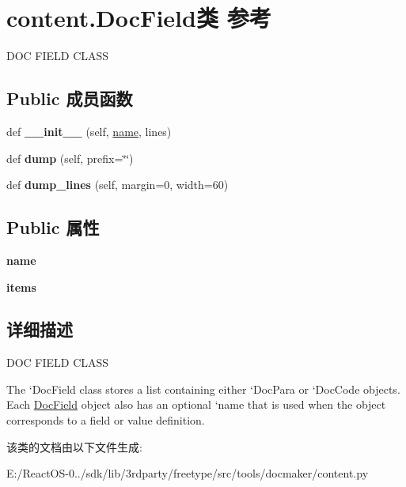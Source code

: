 \hypertarget{classcontent_1_1_doc_field}{}\section{content.\+Doc\+Field类 参考}
\label{classcontent_1_1_doc_field}


D\+OC F\+I\+E\+LD C\+L\+A\+SS  


\subsection*{Public 成员函数}
\begin{DoxyCompactItemize}
\item 
\mbox{\label{classcontent_1_1_doc_field_aee545fdf90bdc952d7693a66f2afc5e6}} 
def {\bfseries \+\_\+\+\_\+init\+\_\+\+\_\+} (self, \hyperlink{structname}{name}, lines)
\item 
\mbox{\label{classcontent_1_1_doc_field_a1646f508e018c91739e87ac3a7abfdff}} 
def {\bfseries dump} (self, prefix=\char`\"{}\char`\"{})
\item 
\mbox{\label{classcontent_1_1_doc_field_aa79ed7b61c0c3caed05fcabd33d8c134}} 
def {\bfseries dump\+\_\+lines} (self, margin=0, width=60)
\end{DoxyCompactItemize}
\subsection*{Public 属性}
\begin{DoxyCompactItemize}
\item 
\mbox{\label{classcontent_1_1_doc_field_ab9296332fc55136afc03f14d5e69dc09}} 
{\bfseries name}
\item 
\mbox{\label{classcontent_1_1_doc_field_af6ffa002c264c725314532a8c207951a}} 
{\bfseries items}
\end{DoxyCompactItemize}


\subsection{详细描述}
D\+OC F\+I\+E\+LD C\+L\+A\+SS 

The `\+Doc\+Field\textquotesingle{} class stores a list containing either `\+Doc\+Para\textquotesingle{} or `\+Doc\+Code\textquotesingle{} objects. Each \hyperlink{classcontent_1_1_doc_field}{Doc\+Field} object also has an optional `name\textquotesingle{} that is used when the object corresponds to a field or value definition. 

该类的文档由以下文件生成\+:\begin{DoxyCompactItemize}
\item 
E\+:/\+React\+O\+S-\/0../sdk/lib/3rdparty/freetype/src/tools/docmaker/content.\+py\end{DoxyCompactItemize}
